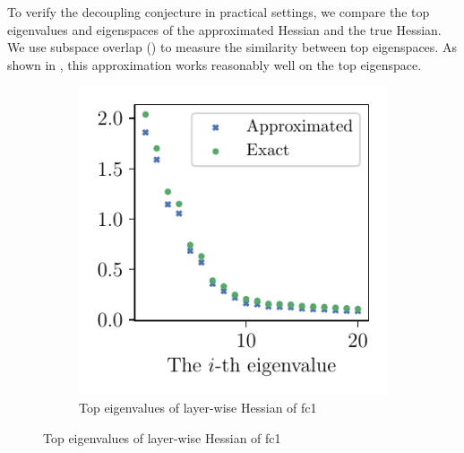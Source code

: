 To verify the decoupling conjecture in practical settings, we compare the top eigenvalues and eigenspaces of the approximated Hessian and the true Hessian. We use subspace overlap () to measure the similarity between top eigenspaces. As shown in , this approximation works reasonably well on the top eigenspace.

\begin{figure}[ht]
    \centering
\begin{subfigure}[b]{0.24\columnwidth}
    \captionsetup{justification=centering}
    \includegraphics[width=\columnwidth]{Figures/ApproxQuality/FC2_fixlr/eigenval_compare_top20_MNIST_Exp1_FC2_fixlr0.01R2_E-1_narrow_fc1.pdf}
    \vspace{-0.2in}
    \caption{Top eigenvalues of layer-wise Hessian of fc1}
    \label{fig:eigenval_approx}
\end{subfigure}%

\end{figure}
